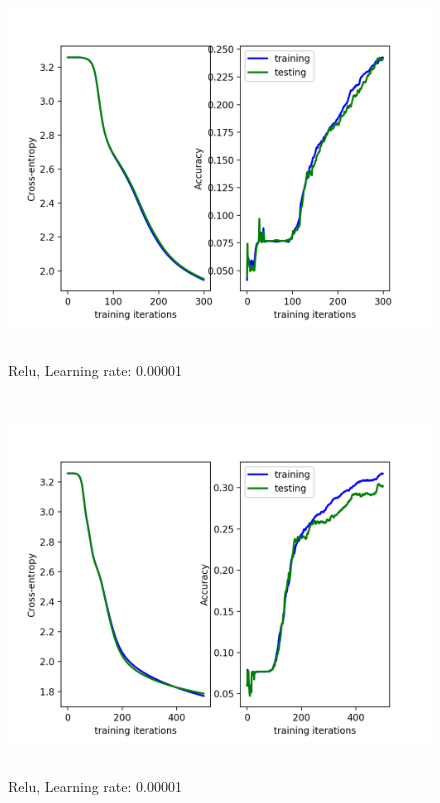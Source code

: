 \documentclass[a4paper]{article}
\begin{document}
\begin{figure}[h]
\caption{Relu, Learning rate: 0.00001}
\centering
\includegraphics[width=12cm, height=10cm]{LR00001_2.png}
\end{figure}

\begin{figure}[h]
\caption{Relu, Learning rate: 0.00001}
\centering
\includegraphics[width=12cm, height=10cm]{LR00001_3.png}
\end{figure}
\end{document}
